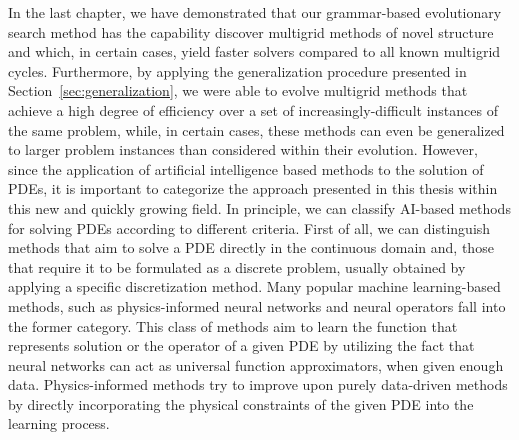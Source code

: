 In the last chapter, we have demonstrated that our grammar-based evolutionary search method has the capability discover multigrid methods of novel structure and which, in certain cases, yield faster solvers compared to all known multigrid cycles.
Furthermore, by applying the generalization procedure presented in  Section~\ref{sec:generalization}, we were able to evolve multigrid methods that achieve a high degree of efficiency over a set of increasingly-difficult instances of the same problem, while, in certain cases, these methods can even be generalized to larger problem instances than considered within their evolution.
However, since the application of artificial intelligence based methods to the solution of PDEs, it is important to categorize the approach presented in this thesis within this new and quickly growing field.
In principle, we can classify AI-based methods for solving PDEs according to different criteria.
First of all, we can distinguish methods that aim to solve a PDE directly in the continuous domain and, those that require it to be formulated as a discrete problem, usually obtained by applying a specific discretization method.
Many popular machine learning-based methods, such as physics-informed neural networks and neural operators fall into the former category.
This class of methods aim to learn the function that represents solution or the operator of a given PDE by utilizing the fact that neural networks can act as universal function approximators, when given enough data.
Physics-informed methods try to improve upon purely data-driven methods by directly incorporating the physical constraints of the given PDE into the learning process.
